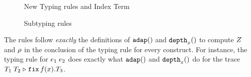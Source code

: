 \documentclass[a4paper,11pt]{article}
\theoremstyle{definition}
\begin{document}
\begin{figure}

  \caption{New Typing rules and Index Term}
  \label{fig:new-type-rules}
\end{figure}


\begin{figure}
 \caption{Subtyping rules}
  \label{fig:sub-type-rules}
\end{figure}


The rules follow \emph{exactly} the definitions of $\mathtt{adap}()$ and
$\mathtt{depth}_{x}()$ to compute $Z$ and $\rho$ in the conclusion of the
typing rule for every construct. For instance, the typing rule for
$e_1 \; e_2$ does exactly what $\mathtt{adap}()$ and $\mathtt{depth}_{x}()$
do for the trace $T_1 \; T_2 \mathrel{\triangleright} {\mathop{\mathtt{fix}} f(x).T_3}$.
\end{document}
